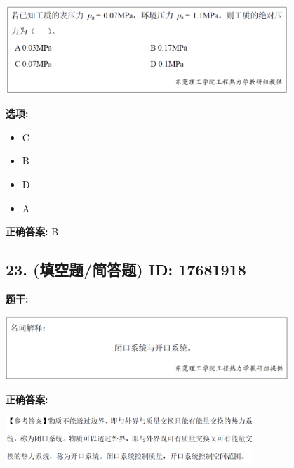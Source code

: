 \documentclass[12pt]{article}
\begin{document}
\begin{center}\includegraphics[width=0.8\textwidth, height=0.25\textheight, keepaspectratio]{question_22_17681906/title_img_1.png}\end{center}

\textbf{选项:}
\begin{itemize}[leftmargin=*]
  \item C

  \item B

  \item D

  \item A

\end{itemize}

\textbf{正确答案:}
B

\vspace{0.5em}\hrulefill\vspace{1em}

\subsection*{23. (填空题/简答题) \small ID: 17681918}

\textbf{题干:}


\begin{center}\includegraphics[width=0.8\textwidth, height=0.25\textheight, keepaspectratio]{question_23_17681918/title_img_1.png}\end{center}

\textbf{正确答案:}

\begin{center}\includegraphics[width=0.7\textwidth, height=0.2\textheight, keepaspectratio]{question_23_17681918/correct_answer_1_img_1.png}\end{center}
\end{document}
